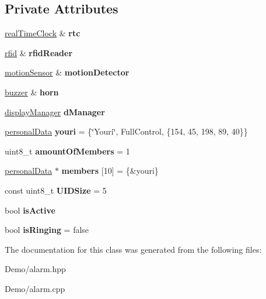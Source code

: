 \subsection*{Private Attributes}
\begin{DoxyCompactItemize}
\item 
\mbox{\label{classalarm_afec7be3c6ef6cefe5e0bc9b8cd2169e9}} 
\mbox{\hyperlink{classreal_time_clock}{real\+Time\+Clock}} \& {\bfseries rtc}
\item 
\mbox{\label{classalarm_a1c53aa85791e56c7a811e218f051df82}} 
\mbox{\hyperlink{classrfid}{rfid}} \& {\bfseries rfid\+Reader}
\item 
\mbox{\label{classalarm_a25b4c008275f022756119e1250b90a98}} 
\mbox{\hyperlink{classmotion_sensor}{motion\+Sensor}} \& {\bfseries motion\+Detector}
\item 
\mbox{\label{classalarm_a8d87a3c8c7b8cce58ad2cee9fa0a4310}} 
\mbox{\hyperlink{classbuzzer}{buzzer}} \& {\bfseries horn}
\item 
\mbox{\label{classalarm_a4fd0e362b51c0d6cab5fa7d30a38af8e}} 
\mbox{\hyperlink{classdisplay_manager}{display\+Manager}} {\bfseries d\+Manager}
\item 
\mbox{\label{classalarm_aa85f0f117c2aa100765e7be92e7e4514}} 
\mbox{\hyperlink{structpersonal_data}{personal\+Data}} {\bfseries youri} = \{\char`\"{}Youri\char`\"{}, Full\+Control, \{154, 45, 198, 89, 40\}\}
\item 
\mbox{\label{classalarm_a0df368fa9b7215aed85c20bf01158a85}} 
uint8\+\_\+t {\bfseries amount\+Of\+Members} = 1
\item 
\mbox{\label{classalarm_acbf7ed273a5a1921d884ae924d07dd33}} 
\mbox{\hyperlink{structpersonal_data}{personal\+Data}} $\ast$ {\bfseries members} \mbox{[}10\mbox{]} = \{\&youri\}
\item 
\mbox{\label{classalarm_a60b21367926834a5a178ea975667f8b4}} 
const uint8\+\_\+t {\bfseries U\+I\+D\+Size} = 5
\item 
\mbox{\label{classalarm_a6437d709cf6639065cffad1018b637be}} 
bool {\bfseries is\+Active}
\item 
\mbox{\label{classalarm_a2418a1fd302f477edd563e6ffb5c407c}} 
bool {\bfseries is\+Ringing} = false
\end{DoxyCompactItemize}


The documentation for this class was generated from the following files\+:\begin{DoxyCompactItemize}
\item 
Demo/alarm.\+hpp\item 
Demo/alarm.\+cpp\end{DoxyCompactItemize}
